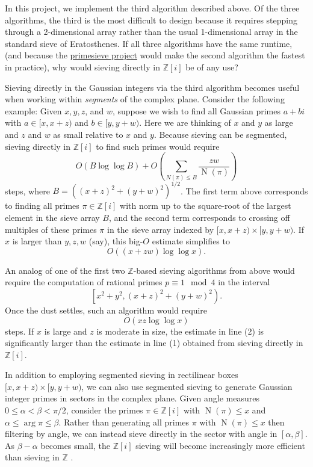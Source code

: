 \documentclass{article}
\begin{document}
 
In this project, we implement the third algorithm described above. Of the three algorithms, the third is the most difficult to design because it requires stepping through a 2-dimensional array rather than the usual 1-dimensional array in the standard sieve of Eratosthenes. If all three algorithms have the same runtime, (and because the \href{https://github.com/kimwalisch/primesieve}{primesieve project} would make the second algorithm the fastest in practice), why would sieving directly in $\mathbb{Z}[i]$ be of any use?

Sieving directly in the Gaussian integers via the third algorithm becomes useful when working within \emph{segments} of the complex plane. Consider the following example: Given $x, y, z$, and $w$, suppose we wish to find all Gaussian primes $a + bi$ with $a \in [x, x + z)$ and $b \in  [y, y + w)$. Here we are thinking of $x$ and $y$ as large and $z$ and $w$ as small relative to $x$ and $y$. Because sieving can be segmented, sieving directly in $\mathbb{Z}[i]$ to find such primes would require
$$O(B \log \log B) + O\left(\sum_{ N(\pi) \le B } \frac{zw}{\operatorname N(\pi)}\right)$$
steps, where $B = ((x + z)^2 + (y + w)^2)^{1/2}$. The first term above corresponds to finding all primes $\pi \in \mathbb{Z}[i]$ with norm up to the square-root of the largest element in the sieve array $B$, and the second term corresponds to crossing off multiples of these primes $\pi$ in the sieve array indexed by $[x, x + z) \times [y, y + w)$. If $x$ is larger than $y, z, w$ (say), this big-$O$ estimate simplifies to
\begin{equation}
O((x + zw) \log \log x).
\end{equation}

An analog of one of the first two $\mathbb{Z}$-based sieving algorithms from above would require the computation of rational primes $p \equiv 1 \mod 4$ in the interval
$$\left[ x^2 + y^2, (x + z)^2 + (y + w)^2 \right).$$
Once the dust settles, such an algorithm would require
\begin{equation}
O(xz\log\log x)
\end{equation}
steps. If $x$ is large and $z$ is moderate in size, the estimate in line (2) is significantly larger than the estimate in line (1) obtained from sieving directly in $\mathbb{Z}[i]$.

In addition to employing segmented sieving in rectilinear boxes $[x, x + z) \times [y, y + w)$, we can also use segmented sieving to generate Gaussian integer primes in sectors in the complex plane. Given angle measures $0 \le \alpha < \beta < \pi/2$, consider the primes $\pi \in \mathbb{Z}[i]$ with $\operatorname N (\pi) \le x$ and $\alpha \le \arg \pi \le \beta$. Rather than generating all primes $\pi$ with $\operatorname N (\pi) \le x$ then filtering by angle, we can instead sieve directly in the sector with angle in $[\alpha, \beta]$. As $\beta - \alpha$ becomes small, the $\mathbb{Z}[i]$ sieving will become increasingly more efficient than sieving in $\mathbb{Z}$ .
\end{document}
